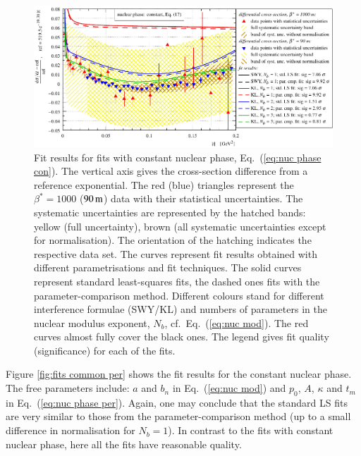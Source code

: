 \begin{figure}
\begin{center}
\includegraphics{fig/fits_common_con.pdf}
\caption{%
Fit results for fits with constant nuclear phase, Eq.~(\ref{eq:nuc phase con}). The vertical axis gives the cross-section difference from a reference exponential. The red (blue) triangles represent the $\beta^* = 1000$ ($90\,{\rm m}$) data with their statistical uncertainties. The systematic uncertainties are represented by the hatched bands: yellow (full uncertainty), brown (all systematic uncertainties except for normalisation). The orientation of the hatching indicates the respective data set.
The curves represent fit results obtained with different parametrisations and fit techniques. The solid curves represent standard least-squares fits, the dashed ones fits with the parameter-comparison method. Different colours stand for different interference formulae (SWY/KL) and numbers of parameters in the nuclear modulus exponent, $N_b$, cf.~Eq.~(\ref{eq:nuc mod}). The red curves almost fully cover the black ones. The legend gives fit quality (significance) for each of the fits.
}
\label{fig:fits common con}
\end{center}
\end{figure}

Figure \ref{fig:fits common per} shows the fit results for the constant nuclear phase. The free parameters include: $a$ and $b_n$ in Eq.~(\ref{eq:nuc mod}) and $p_0$, $A$, $\kappa$ and $t_m$ in Eq.~(\ref{eq:nuc phase per}). Again, one may conclude that the standard LS fits are very similar to those from the parameter-comparison method (up to a small difference in normalisation for $N_b = 1$). In contrast to the fits with constant nuclear phase, here all the fits have reasonable quality.

